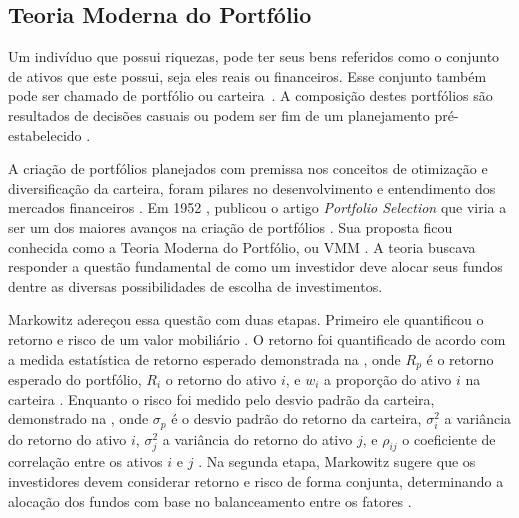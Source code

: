 \subsection{Teoria Moderna do Portfólio}

Um indivíduo que possui riquezas, pode ter seus bens referidos como o conjunto de ativos que este possui, seja eles reais ou financeiros. Esse conjunto também pode ser chamado de portfólio ou carteira~\cite{elton2012moderna}. A composição destes portfólios são resultados de decisões casuais ou podem ser fim de um planejamento pré-estabelecido \cite{elton2012moderna}.

A criação de portfólios planejados com premissa nos conceitos de otimização e diversificação da carteira, foram pilares no desenvolvimento e entendimento dos mercados financeiros \cite{kolm201460}. Em 1952 \textcite{markowitz}, publicou o artigo \emph{Portfolio Selection} que viria a ser um dos maiores avanços na criação de portfólios \cite{kolm201460}. Sua proposta ficou conhecida como a Teoria Moderna do Portfólio, ou \acrfull{VMM} \cite{markowitz}. A teoria buscava responder a questão fundamental de como um investidor deve alocar seus fundos dentre as diversas possibilidades de escolha de investimentos. 

Markowitz adereçou essa questão com duas etapas. Primeiro ele quantificou o retorno e risco de um valor mobiliário \cite{kolm201460}. O retorno foi quantificado de acordo com a medida estatística de retorno esperado demonstrada na , onde $R_p$ é o retorno esperado do portfólio, $R_i$ o retorno do ativo $i$, e $w_i$ a proporção do ativo $i$ na carteira \cite{elton2012moderna}. Enquanto o risco foi medido pelo desvio padrão da carteira, demonstrado na , onde $\sigma_{p}$ é o desvio padrão do retorno da carteira, $\sigma _{i}^{2}$ a variância do retorno do ativo $i$, $\sigma _{j}^{2}$ a variância do retorno do ativo $j$, e $\rho _{ij}$ o coeficiente de correlação entre os ativos $i$ e $j$ \cite{elton2012moderna}. Na segunda etapa, Markowitz sugere que os investidores devem considerar retorno e risco de forma conjunta, determinando a alocação dos fundos com base no balanceamento entre os fatores \cite{kolm201460}.



